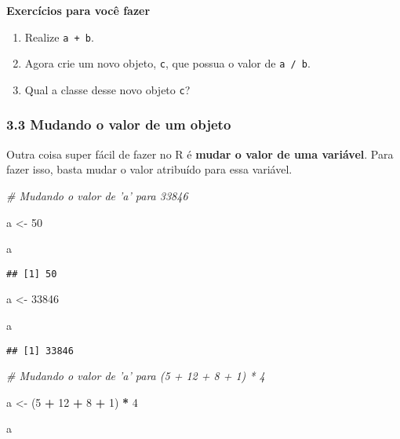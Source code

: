 \documentclass[
]{article}
\newenvironment{Shaded}{\begin{snugshade}}{\end{snugshade}}
\newcommand{\CommentTok}[1]{\textcolor[rgb]{0.56,0.35,0.01}{\textit{#1}}}
\newcommand{\DecValTok}[1]{\textcolor[rgb]{0.00,0.00,0.81}{#1}}
\newcommand{\NormalTok}[1]{#1}
\newcommand{\OperatorTok}[1]{\textcolor[rgb]{0.81,0.36,0.00}{\textbf{#1}}}
\newcommand{\StringTok}[1]{\textcolor[rgb]{0.31,0.60,0.02}{#1}}
\begin{document}
\textbf{Exercícios para você fazer}

\begin{enumerate}
\def\labelenumi{\arabic{enumi}.}
\item
  Realize \texttt{a\ +\ b}.
\item
  Agora crie um novo objeto, \texttt{c}, que possua o valor de
  \texttt{a\ /\ b}.
\item
  Qual a classe desse novo objeto \texttt{c}?
\end{enumerate}

\hypertarget{mudando-o-valor-de-um-objeto}{%
\subsubsection{3.3 Mudando o valor de um
objeto}\label{mudando-o-valor-de-um-objeto}}

Outra coisa super fácil de fazer no R é \textbf{mudar o valor de uma
variável}. Para fazer isso, basta mudar o valor atribuído para essa
variável.

\begin{Shaded}
\begin{Highlighting}[]
\CommentTok{# Mudando o valor de 'a' para 33846}

\NormalTok{a <-}\StringTok{ }\DecValTok{50}

\NormalTok{a}
\end{Highlighting}
\end{Shaded}

\begin{verbatim}
## [1] 50
\end{verbatim}

\begin{Shaded}
\begin{Highlighting}[]
\NormalTok{a <-}\StringTok{ }\DecValTok{33846}

\NormalTok{a}
\end{Highlighting}
\end{Shaded}

\begin{verbatim}
## [1] 33846
\end{verbatim}

\begin{Shaded}
\begin{Highlighting}[]
\CommentTok{# Mudando o valor de 'a' para (5 + 12 + 8 + 1) * 4}

\NormalTok{a <-}\StringTok{ }\NormalTok{(}\DecValTok{5} \OperatorTok{+}\StringTok{ }\DecValTok{12} \OperatorTok{+}\StringTok{ }\DecValTok{8} \OperatorTok{+}\StringTok{ }\DecValTok{1}\NormalTok{) }\OperatorTok{*}\StringTok{ }\DecValTok{4}

\NormalTok{a}
\end{Highlighting}
\end{Shaded}
\end{document}
